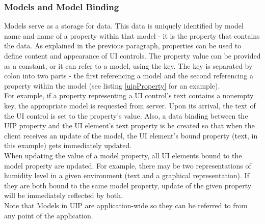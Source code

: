 \subsubsection{Models and Model Binding}
Models serve as a storage for data. This data is uniquely identified by model name and name of a property within that model - it is the property that contains the data. As explained in the previous paragraph, properties can be used to define content and appearance of UI controls. The property value can be provided as a constant, or it can refer to a model, using the key. The key is separated by colon into two parts - the first referencing a model and the second referencing a property within the model (see listing \ref{uipProperty} for an example).\\
For example, if a property representing a UI control's text contains a nonempty key, the appropriate model is requested from server. Upon its arrival, the text of the UI control is set to the property's value. Also, a data binding between the UIP property and the UI element's text property is be created so that when the client receives an update of the model, the UI element's bound property (text, in this example) gets immediately updated.
\\
When updating the value of a model property, all UI elements bound to the model property are updated. For example, there may be two representations of humidity level in a given environment (text and a graphical representation). If they are both bound to the same model property, update of the given property will be immediately reflected by both.\\
Note that Models in UIP are application-wide so they can be referred to from any point of the application.

\endinput